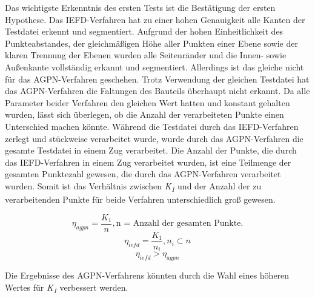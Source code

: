 Das wichtigste Erkenntnis des ersten Tests ist die Bestätigung der ersten Hypothese. Das IEFD-Verfahren hat zu einer hohen Genauigkeit alle Kanten der Testdatei erkennt und segmentiert. Aufgrund der hohen Einheitlichkeit des Punkteabstandes, der gleichmäßigen Höhe aller Punkten einer Ebene sowie der klaren Trennung der Ebenen wurden alle Seitenränder und die Innen- sowie Außenkante vollständig erkannt und segmentiert. Allerdings ist das gleiche nicht für das AGPN-Verfahren geschehen. Trotz Verwendung der gleichen Testdatei hat das AGPN-Verfahren die Faltungen des Bauteils überhaupt nicht erkannt. Da alle Parameter beider Verfahren den gleichen Wert hatten und konstant gehalten wurden, lässt sich überlegen, ob die Anzahl der verarbeiteten Punkte einen Unterschied machen könnte. Während die Testdatei durch das IEFD-Verfahren zerlegt und stückweise verarbeitet wurde, wurde durch das AGPN-Verfahren die gesamte Testdatei in einem Zug verarbeitet. Die Anzahl der Punkte, die durch das IEFD-Verfahren in einem Zug verarbeitet wurden, ist eine Teilmenge der gesamten Punktezahl gewesen, die durch das AGPN-Verfahren verarbeitet wurden. Somit ist das Verhältnis zwischen \textit{K\textsubscript{1}} und der Anzahl der zu verarbeitenden Punkte für beide Verfahren unterschiedlich groß gewesen.

\begin{displaymath}
	\eta_{agpn} = \frac{K_1}{n}, \text{n = Anzahl der gesamten Punkte.}
\end{displaymath}
\begin{displaymath}
	\eta_{iefd} = \frac{K_1}{n_i}, n_i \subset n
\end{displaymath}
\begin{displaymath}
	\eta_{iefd} > \eta_{agpn}
\end{displaymath}

Die Ergebnisse des AGPN-Verfahrens könnten durch die Wahl eines höheren Wertes für \textit{K\textsubscript{1}} verbessert werden.

